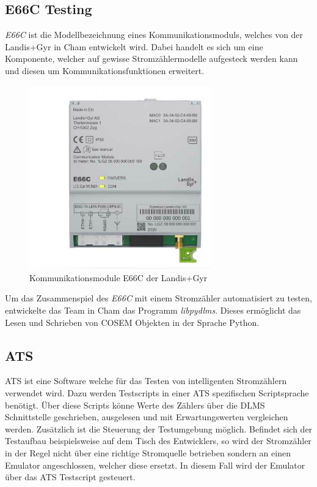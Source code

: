 \subsection{E66C Testing}\label{pythonTesting}
\textit{E66C} ist die Modellbezeichnung eines Kommunikationsmoduls, welches von der Landis+Gyr in Cham entwickelt wird.
Dabei handelt es sich um eine Komponente, welcher auf gewisse Stromzählermodelle aufgesteck werden kann und diesen um Kommunikationsfunktionen erweitert.

\begin{figure}[H]
   \centering
   \includegraphics[width=0.7\textwidth]{gfx/landis-e66c.jpg}
   \caption{
      Kommunikationsmodule E66C der Landis+Gyr
   }
   \label{fig:e66c}
\end{figure}

Um das Zusammenspiel des \textit{E66C} mit einem Stromzähler automatisiert zu testen, entwickelte das Team in Cham das Programm \textit{libpydlms}.
Dieses ermöglicht das Lesen und Schrieben von \ac{COSEM} Objekten in der Sprache Python.


\subsection{ATS}\label{ats}
\ac{ATS} ist eine Software welche für das Testen von intelligenten Stromzählern verwendet wird.
Dazu werden Testscripts in einer \ac{ATS} spezifischen Scriptsprache benötigt.
Über diese Scripts könne Werte des Zählers über die \ac{DLMS} Schnittstelle geschrieben, ausgelesen und mit Erwartungswerten vergleichen werden.
Zusätzlich ist die Steuerung der Testumgebung möglich.
Befindet sich der Testaufbau beispielsweise auf dem Tisch des Entwicklers, so wird der Stromzähler in der Regel nicht über eine richtige Stromquelle betrieben sondern an einen Emulator angeschlossen, welcher diese ersetzt.
In diesem Fall wird der Emulator über das \ac{ATS} Testscript gesteuert.

